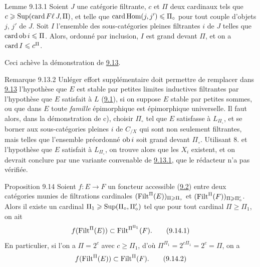 \documentclass[10pt]{../fichiers-configuration-latex/smfart}
\begin{document}
\begin{enonce*}{Lemme 9.13.1}
Soient $J$ une catégorie filtrante, $c$ et $\Pi$ deux cardinaux tels
que $c\geqslant \operatorname{Sup}(\operatorname{card}  F\ell\,  J,\Pi)$, et telle que $\operatorname{card}
\operatorname{Hom}(j,j')\leqslant \Pi_\circ$ pour tout couple d'objets $j$, $j'$ de
$J$. Soit $I$ l'ensemble des sous-catégories pleines filtrantes $i$
de $J$ telles que $\operatorname{card} \operatorname{ob} i\leqslant \Pi$. Alors, ordonné par
inclusion, $I$ est grand devant $\Pi$, et on a $\operatorname{card} I\leqslant
c^{\Pi}$.
\end{enonce*}

Ceci achève la démonstration de \hyperref[I.prop9.13]{9.13}.

\begin{enonce*}[remark]{Remarque 9.13.2}
Un\pageoriginale léger effort supplémentaire doit permettre de
remplacer dans \hyperref[I.prop9.13]{9.13} l'hypothèse que $E$ est stable par
petites limites inductives filtrantes par l'hypothèse que $E$
satisfait à $L$ (\hyperref[I.def9.1]{9.1}), si on suppose $E$ stable par
petites sommes, ou que dans $E$ toute \emph{famille} épimorphique
est épimorphique universelle. Il faut alors, dans la démonstration
de c), choisir $\Pi_\circ$ tel que $E$ satisfasse à $L_{\Pi_\circ}$,
et se borner aux sous-catégories pleines $i$ de $C_{/X}$ qui sont
non seulement filtrantes, mais telles que l'ensemble préordonné $\operatorname{ob}
i$ soit grand devant $\Pi_\circ$. Utilisant 8. et l'hypothèse que
$E$ satisfait à $L_{\Pi_\circ}$, on trouve alors que les $X_i$
existent, et on devrait conclure par une variante convenable de
\hyperref[I.lem9.13.1]{9.13.1}, que le rédacteur n'a pas vérifiée.
\end{enonce*}

\begin{enonce*}{Proposition 9.14}
Soient $f:E\rightarrow F$ un foncteur accessible (\hyperref[I.def9.2]{9.2}) entre deux
catégories munies de filtrations cardinales
$(\operatorname{Filt}^{\Pi}(E))_{\Pi\geqslant\Pi_\circ}$ et
$(\operatorname{Filt}^{\Pi}(F))_{\Pi\geqslant\Pi'_\circ}$. Alors il existe un cardinal
$\Pi_1\geqslant \operatorname{Sup}(\Pi_\circ, \Pi'_\circ)$ tel que pour tout cardinal
$\Pi\geq \Pi_1$, on ait
\begin{equation}
f(\operatorname{Filt}^{\Pi}(E))\subset \operatorname{Filt}^{\Pi^{\Pi_1}}(F){}.\tag{9.14.1}
\end{equation}
En particulier, si l'on a $\Pi=2^c$ avec $c\geq \Pi_1$, d'où
$\Pi^{\Pi_1}=2^{c\Pi_1}=2^c=\Pi$, on a
\begin{equation}
f(\operatorname{Filt}^{\Pi}(E))\subset \operatorname{Filt}^{\Pi}(F){}.\tag{9.14.2}
\end{equation}
\end{enonce*}
\end{document}
